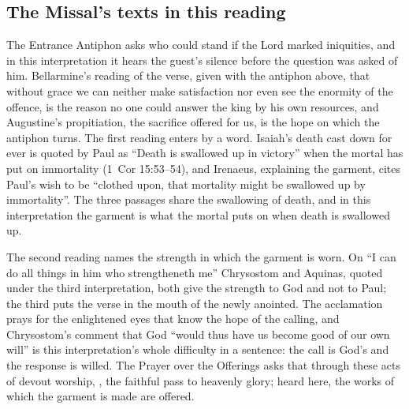\subsection{The Missal's texts in this reading}

The Entrance Antiphon asks who could stand if the Lord marked iniquities, and
in this interpretation it hears the guest's silence before the question was
asked of him. Bellarmine's reading of the verse, given with the antiphon
above, that without grace we can neither make satisfaction nor even see the
enormity of the offence, is the reason no one could answer the king by his own
resources, and Augustine's propitiation, the sacrifice offered for us, is the
hope on which the antiphon turns. The first reading enters by a
word. Isaiah's death cast down for ever is quoted by Paul as ``Death is
swallowed up in victory'' when the mortal has put on immortality (1~Cor
15:53--54), and Irenaeus, explaining the garment, cites Paul's wish to be
``clothed upon, that mortality might be swallowed up by immortality''. The
three passages share the swallowing of death, and in this interpretation the
garment is what the mortal puts on when death is swallowed up.

The second reading names the strength in which the garment is worn. On ``I can
do all things in him who strengtheneth me'' Chrysostom and Aquinas, quoted
under the third interpretation, both give the strength to God and not to Paul;
the third  puts the verse in the mouth of the
newly anointed. The acclamation prays for the enlightened eyes that know the hope of
the calling, and Chrysostom's comment that God ``would thus have us become good
of our own will'' is this interpretation's whole difficulty in a sentence: the
call is God's and the response is willed. The Prayer over the Offerings asks
that through these acts of devout worship, , the faithful pass to heavenly glory; heard here, the works of which
the garment is made are offered.

